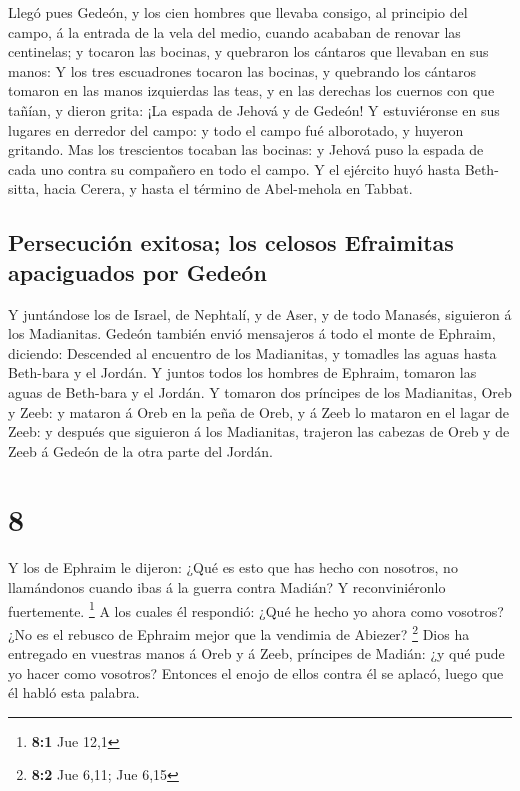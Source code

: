  Llegó pues Gedeón, y los cien hombres que llevaba
consigo, al principio del campo, á la entrada de la vela del medio,
cuando acababan de renovar las centinelas; y tocaron las bocinas, y
quebraron los cántaros que llevaban en sus manos:  Y los
tres escuadrones tocaron las bocinas, y quebrando los cántaros tomaron
en las manos izquierdas las teas, y en las derechas los cuernos con que
tañían, y dieron grita: ¡La espada de Jehová y de Gedeón!
 Y estuviéronse en sus lugares en derredor del campo: y
todo el campo fué alborotado, y huyeron gritando.  Mas
los trescientos tocaban las bocinas: y Jehová puso la espada de cada uno
contra su compañero en todo el campo. Y el ejército huyó hasta
Beth-sitta, hacia Cerera, y hasta el término de Abel-mehola en Tabbat.

\hypertarget{persecuciuxf3n-exitosa-los-celosos-efraimitas-apaciguados-por-gedeuxf3n}{%
\subsection{Persecución exitosa; los celosos Efraimitas apaciguados por
Gedeón}\label{persecuciuxf3n-exitosa-los-celosos-efraimitas-apaciguados-por-gedeuxf3n}}

 Y juntándose los de Israel, de Nephtalí, y de Aser, y de
todo Manasés, siguieron á los Madianitas.  Gedeón también
envió mensajeros á todo el monte de Ephraim, diciendo: Descended al
encuentro de los Madianitas, y tomadles las aguas hasta Beth-bara y el
Jordán. Y juntos todos los hombres de Ephraim, tomaron las aguas de
Beth-bara y el Jordán.  Y tomaron dos príncipes de los
Madianitas, Oreb y Zeeb: y mataron á Oreb en la peña de Oreb, y á Zeeb
lo mataron en el lagar de Zeeb: y después que siguieron á los
Madianitas, trajeron las cabezas de Oreb y de Zeeb á Gedeón de la otra
parte del Jordán.

\hypertarget{section-7}{%
\section{8}\label{section-7}}

 Y los de Ephraim le dijeron: ¿Qué es esto que has hecho
con nosotros, no llamándonos cuando ibas á la guerra contra Madián? Y
reconviniéronlo fuertemente. \footnote{\textbf{8:1} Jue 12,1}
 A los cuales él respondió: ¿Qué he hecho yo ahora como
vosotros? ¿No es el rebusco de Ephraim mejor que la vendimia de Abiezer?
\footnote{\textbf{8:2} Jue 6,11; Jue 6,15}  Dios ha
entregado en vuestras manos á Oreb y á Zeeb, príncipes de Madián: ¿y qué
pude yo hacer como vosotros? Entonces el enojo de ellos contra él se
aplacó, luego que él habló esta palabra.

